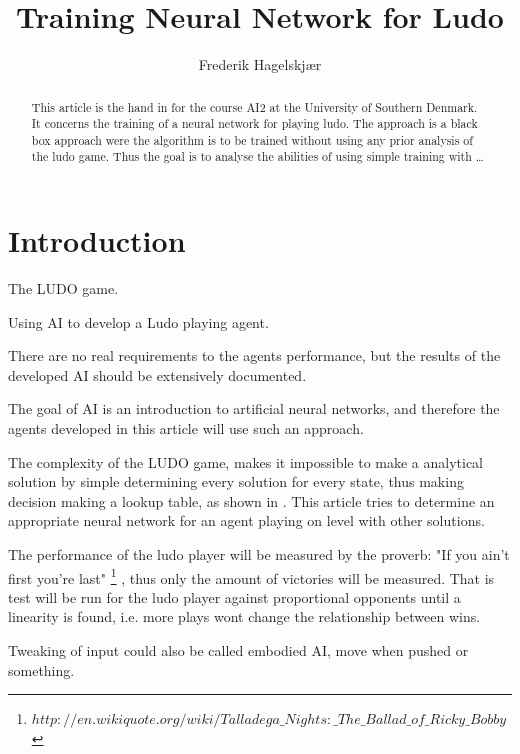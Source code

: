 \documentclass{llncs}
\begin{document}
\title{Training Neural Network for Ludo}
\author{Frederik Hagelskjær}
\maketitle

\begin{abstract}

This article is the hand in for the course AI2 at the University of Southern Denmark. It concerns the training of a neural network for playing ludo. The approach is a black box approach were the algorithm is to be trained without using any prior analysis of the ludo game. Thus the goal is to analyse the abilities of using simple training with \ldots

\end{abstract}

\section*{Introduction} %

The LUDO game. 

Using AI to develop a Ludo playing agent. 

There are no real requirements to the agents performance, but the results of the developed AI should be extensively documented. 

The goal of AI is an introduction to artificial neural networks, and therefore the agents developed in this article will use such an approach.

The complexity of the LUDO game, makes it impossible to make a analytical solution by simple determining every solution for every state, thus making decision making a lookup table, as shown in \cite{6031999}. This article tries to determine an appropriate neural network for an agent playing on level with other solutions.

The performance of the ludo player will be measured by the proverb: "If you ain't first you're last" \footnote{ $http://en.wikiquote.org/wiki/Talladega\_Nights:\_The\_Ballad\_of\_Ricky\_Bobby$}
, thus only the amount of victories will be measured. That is test will be run for the ludo player against proportional opponents until a linearity is found, i.e. more plays wont change the relationship between wins.

Tweaking of input could also be called embodied AI, move when pushed or something.
\end{document}
